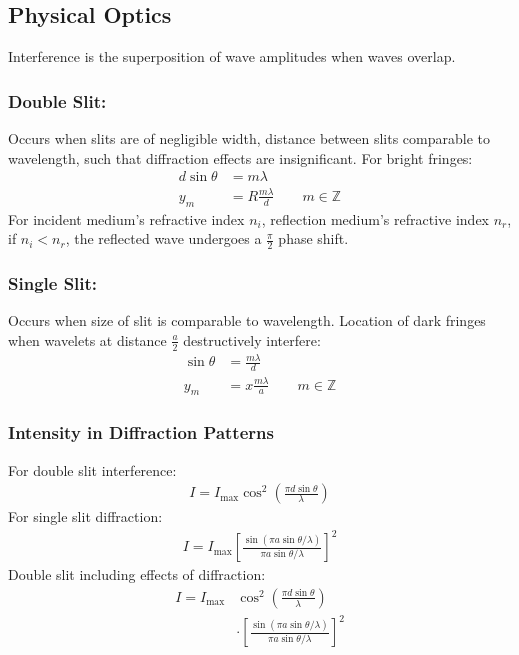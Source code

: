 \documentclass[a4paper]{article}
\begin{document}
\begin{multicols*}{2}
\subsection{Physical Optics}
Interference is the superposition of wave amplitudes when waves overlap.
\subsubsection{Double Slit:}
Occurs when slits are of negligible width, distance between slits comparable to
wavelength, such that diffraction effects are insignificant. For bright fringes:
\begin{align*}
  d\sin{\theta}&=m\lambda \\
  y_m&=R\frac{m\lambda}{d} \qquad m \in \mathbb{Z}
\end{align*}
For incident medium's refractive index $n_i$, reflection medium's refractive
index $n_r$, if $n_i < n_r$, the reflected wave undergoes a $\frac{\pi}{2}$
phase shift.
\subsubsection{Single Slit:}
Occurs when size of slit is comparable to wavelength. Location of dark fringes
when wavelets at distance $\frac{a}{2}$ destructively interfere:
\begin{align*}
  \sin{\theta}&=\frac{m\lambda}{d} \\
  y_m&=x\frac{m\lambda}{a} \qquad m \in \mathbb{Z}
\end{align*}
\subsubsection{Intensity in Diffraction Patterns}
For double slit interference:
\begin{align*}
  I = I_{\text{max}} \cos^2\left(\frac{\pi d \sin{\theta}}{\lambda} \right)
\end{align*}
For single slit diffraction:
\begin{align*}
  I = I_{\text{max}} \left [\frac{\sin(\pi a \sin \theta / \lambda)}{\pi a \sin
      \theta / \lambda} \right]^2
\end{align*}
Double slit including effects of diffraction:
\begin{align*}
  I = I_{\text{max}} &\cos^2\left(\frac{\pi d \sin{\theta}}{\lambda} \right) \\
  &\cdot \left [\frac{\sin(\pi a \sin \theta / \lambda)}{\pi a \sin \theta /
      \lambda} \right]^2
\end{align*}

\end{multicols*}
\end{document}
